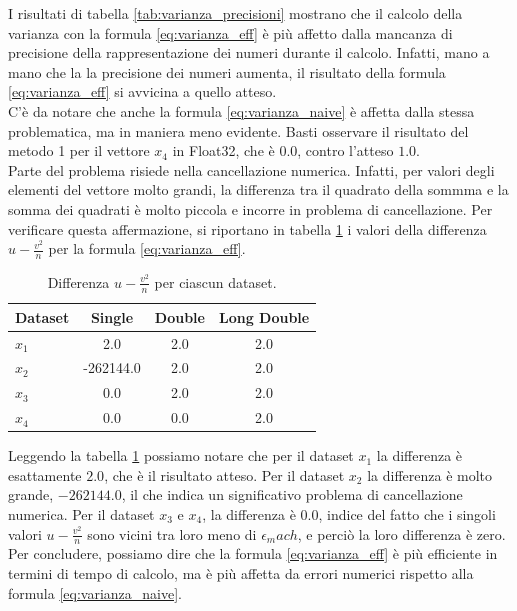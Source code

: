 \documentclass[letterpaper, 12pt]{article}
\begin{document}
I risultati di tabella \ref{tab:varianza_precisioni} mostrano che il calcolo della varianza con la formula 
\ref{eq:varianza_eff} è più affetto dalla mancanza di precisione della rappresentazione dei numeri durante il calcolo.
Infatti, mano a mano che la la precisione dei numeri aumenta, il risultato della formula \ref{eq:varianza_eff} 
si avvicina a quello atteso. \\
C'è da notare che anche la formula \ref{eq:varianza_naive} è affetta dalla stessa problematica, ma in maniera meno
evidente. Basti osservare il risultato del metodo 1 per il vettore $x_4$ in Float32, che è $0.0$, contro l'atteso 
$1.0$. \\
Parte del problema risiede nella cancellazione numerica. Infatti, per valori degli elementi del vettore molto grandi,
la differenza tra il quadrato della sommma e la somma dei quadrati è molto piccola e incorre in problema di
cancellazione. Per verificare questa affermazione, si riportano in tabella \ref{tab:errore_varianza} i valori della 
differenza \( u - \frac{v^2}{n} \)
per la formula \ref{eq:varianza_eff}.

\begin{table}[!ht]
\centering
\caption{Differenza \( u - \frac{v^2}{n} \) per ciascun dataset.}
\label{tab:errore_varianza}
\begin{tabular}{|l|c|c|c|}
\hline
\textbf{Dataset} & \textbf{Single} & \textbf{Double} & \textbf{Long Double} \\
\hline
$x_1$ & 2.0       & 2.0 & 2.0 \\
$x_2$ & -262144.0 & 2.0 & 2.0 \\
$x_3$ & 0.0       & 2.0 & 2.0 \\
$x_4$ & 0.0       & 0.0 & 2.0 \\
\hline
\end{tabular}
\end{table}

Leggendo la tabella \ref{tab:errore_varianza} possiamo notare che per il dataset $x_1$ la differenza è esattamente
$2.0$, che è il risultato atteso. Per il dataset $x_2$ la differenza è molto grande, $-262144.0$, il che indica un
significativo problema di cancellazione numerica. Per il dataset $x_3$ e $x_4$, la differenza è $0.0$, indice 
del fatto che i singoli valori \( u - \frac{v^2}{n} \) sono vicini tra loro meno di $\epsilon_mach$, e perciò la 
loro differenza è zero. \\
Per concludere, possiamo dire che la formula \ref{eq:varianza_eff} è più efficiente in termini di tempo di calcolo,
ma è più affetta da errori numerici rispetto alla formula \ref{eq:varianza_naive}.
\end{document}
